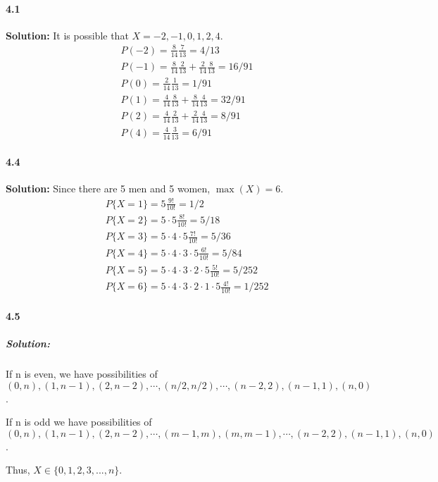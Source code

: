 \documentclass[11pt]{article}
\begin{document}
	\paragraph{4.1}\textbf{Solution:}
	It is possible that $X = -2, -1, 0, 1, 2, 4$.
		\begin{align}
			&P(-2) = \frac{8}{14}\frac{7}{13} = 4/13\nonumber\\
			&P(-1) = \frac{8}{14}\frac{2}{13} + \frac{2}{14}\frac{8}{13} = 16/91\nonumber\\
			&P(0) = \frac{2}{14}\frac{1}{13} = 1/91\nonumber\\
			&P(1) = \frac{4}{14}\frac{8}{13} + \frac{8}{14}\frac{4}{13} = 32/91\nonumber\\
			&P(2) = \frac{4}{14}\frac{2}{13} + \frac{2}{14}\frac{4}{13} = 8/91\nonumber\\
			&P(4) = \frac{4}{14}\frac{3}{13} = 6/91\nonumber
		\end{align}
	\paragraph{4.4}\textbf{Solution:} Since there are 5 men and 5 women, $\max(X) = 6$.
		\begin{align}
			&P\{X=1\} = 5\frac{9!}{10!} = 1/2\nonumber\\
			&P\{X=2\} = 5\cdot 5\frac{8!}{10!} = 5/18\nonumber\\
			&P\{X=3\} = 5\cdot 4\cdot 5\frac{7!}{10!} = 5/36\nonumber\\
			&P\{X=4\} = 5\cdot 4\cdot 3\cdot 5\frac{6!}{10!} = 5/84\nonumber\\
			&P\{X=5\} = 5\cdot 4\cdot 3\cdot 2\cdot 5\frac{5!}{10!} = 5/252\nonumber\\
			&P\{X=6\} = 5\cdot 4\cdot 3\cdot 2\cdot 1\cdot 5\frac{4!}{10!} = 1/252\nonumber
		\end{align}
	\paragraph{4.5}
		\subparagraph{Solution:}
			If n is even, we have possibilities of $(0, n), (1, n - 1), (2, n - 2), \cdots, (n/2, n/2), \cdots, (n - 2, 2), (n - 1, 1), (n, 0)$.
			
			If n is odd we have possibilities of $(0, n), (1, n - 1), (2, n - 2), \cdots, (m - 1, m), (m , m - 1), \cdots, (n - 2, 2), (n - 1, 1), (n, 0)$.
			
			Thus, $X \in \{0, 1, 2, 3, ... , n\}$.
\end{document}
